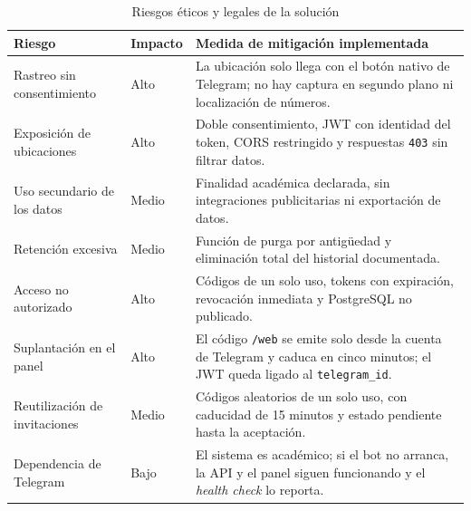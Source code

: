\begin{table}[H]
	\caption{Riesgos éticos y legales de la solución}
	\label{tab:riesgos-eticos}
	\centering
	\footnotesize
	\setlength{\tabcolsep}{3pt}
	\renewcommand{\arraystretch}{1.2}
	\begin{tabularx}{\textwidth}{@{}>{\raggedright\arraybackslash}p{} >{\raggedright\arraybackslash}p{} Y@{}}
		\toprule
		\textbf{Riesgo} & \textbf{Impacto} & \textbf{Medida de mitigación implementada} \\
		\midrule
		Rastreo sin consentimiento & Alto & La ubicación solo llega con el botón nativo de Telegram; no hay captura en segundo plano ni localización de números. \\
		Exposición de ubicaciones & Alto & Doble consentimiento, JWT con identidad del token, CORS restringido y respuestas \texttt{403} sin filtrar datos. \\
		Uso secundario de los datos & Medio & Finalidad académica declarada, sin integraciones publicitarias ni exportación de datos. \\
		Retención excesiva & Medio & Función de purga por antigüedad y eliminación total del historial documentada. \\
		Acceso no autorizado & Alto & Códigos de un solo uso, tokens con expiración, revocación inmediata y PostgreSQL no publicado. \\
		Suplantación en el panel & Alto & El código \texttt{/web} se emite solo desde la cuenta de Telegram y caduca en cinco minutos; el JWT queda ligado al \texttt{telegram\_id}. \\
		Reutilización de invitaciones & Medio & Códigos aleatorios de un solo uso, con caducidad de 15 minutos y estado pendiente hasta la aceptación. \\
		Dependencia de Telegram & Bajo & El sistema es académico; si el bot no arranca, la API y el panel siguen funcionando y el \emph{health check} lo reporta. \\
		\bottomrule
	\end{tabularx}
\end{table}

